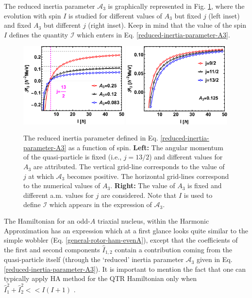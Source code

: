 The reduced inertia parameter $\mathscr{A}_3$ is graphically represented in Fig. \ref{reduced-inertia-A3-figs}, where the evolution with spin $I$ is studied for different values of $A_3$ but fixed $j$ (left inset) and fixed $A_3$ but different $j$ (right inset). Keep in mind that the value of the spin $I$ defines the quantity $\mathscr{I}$ which enters in Eq. \ref{reduced-inertia-parameter-A3}.
\begin{figure}
    \centering
    \includegraphics[width=0.49\textwidth]{Chapters/Figures/reducedInertia_fig1.pdf}
    \includegraphics[width=0.49\textwidth]{Chapters/Figures/reducedInertia_fig2.pdf}
    \caption{The reduced inertia parameter defined in Eq. \ref{reduced-inertia-parameter-A3} as a function of spin. \textbf{Left:} The angular momentum of the quasi-particle is fixed (i.e., $j=13/2$) and different values for $A_3$ are attributed. The vertical grid-line corresponds to the value of $j$ at which $\mathscr{A}_3$ becomes positive. The horizontal grid-lines correspond to the numerical values of $A_3$. \textbf{Right:} The value of $A_3$ is fixed and different a.m. values for $j$ are considered. Note that $I$ is used to define $\mathscr{I}$ which appears in the expression of $\mathscr{A}_3$.}
    \label{reduced-inertia-A3-figs}
\end{figure}

The Hamiltonian for an odd-$A$ triaxial nucleus, within the Harmonic Approximation has an expression which at a first glance looks quite similar to the simple wobbler (Eq. \ref{general-rotor-ham-evenA}), except that the coefficients of the first and second components $\hat{I}_{1,2}$ contain a contribution coming from the quasi-particle itself (through the `reduced' inertia parameter $\mathscr{A}_3$ given in Eq. \ref{reduced-inertia-parameter-A3}). It is important to mention the fact that one can typically apply HA method for the QTR Hamiltonian only when $\hat{I}_1^2+\hat{I}_2^2<<I(I+1)$ \cite{bohr1998nuclear,frauendorf2014transverse}.

